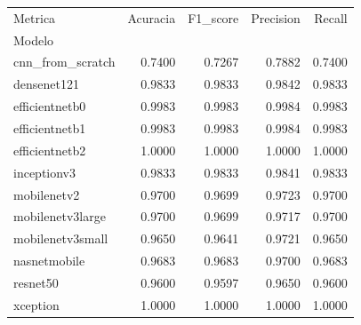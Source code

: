 \begin{tabular}{lrrrr}
\toprule
Metrica & Acuracia & F1_score & Precision & Recall \\
Modelo &  &  &  &  \\
\midrule
cnn_from_scratch & 0.7400 & 0.7267 & 0.7882 & 0.7400 \\
densenet121 & 0.9833 & 0.9833 & 0.9842 & 0.9833 \\
efficientnetb0 & 0.9983 & 0.9983 & 0.9984 & 0.9983 \\
efficientnetb1 & 0.9983 & 0.9983 & 0.9984 & 0.9983 \\
efficientnetb2 & 1.0000 & 1.0000 & 1.0000 & 1.0000 \\
inceptionv3 & 0.9833 & 0.9833 & 0.9841 & 0.9833 \\
mobilenetv2 & 0.9700 & 0.9699 & 0.9723 & 0.9700 \\
mobilenetv3large & 0.9700 & 0.9699 & 0.9717 & 0.9700 \\
mobilenetv3small & 0.9650 & 0.9641 & 0.9721 & 0.9650 \\
nasnetmobile & 0.9683 & 0.9683 & 0.9700 & 0.9683 \\
resnet50 & 0.9600 & 0.9597 & 0.9650 & 0.9600 \\
xception & 1.0000 & 1.0000 & 1.0000 & 1.0000 \\
\bottomrule
\end{tabular}
